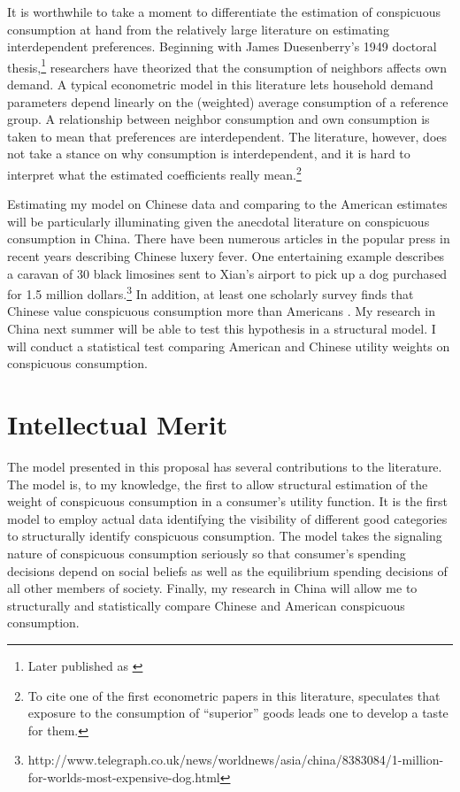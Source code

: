 \documentclass[a4paper,10pt]{article}
\begin{document}
It is worthwhile to take a moment to differentiate the estimation of conspicuous consumption at hand from the relatively large literature on estimating interdependent preferences.  Beginning with James Duesenberry's 1949 doctoral thesis,\footnote{Later published as \citep{Duesenberry1949}} researchers have theorized that the consumption of neighbors affects own demand.  A typical econometric model in this literature lets household demand parameters depend linearly on the (weighted) average consumption of a reference group. A relationship between neighbor consumption and own consumption is taken to mean that preferences are interdependent.  The literature, however, does not take a stance on why consumption is interdependent, and it is hard to interpret what the estimated coefficients really mean.\footnote{To cite one of the first econometric papers in this literature, \citet{Pollak1976} speculates that exposure to the consumption of ``superior'' goods leads one to develop a taste for them.}  

Estimating my model on Chinese data and comparing to the American estimates will be particularly illuminating given the anecdotal literature on conspicuous consumption in China.  There have been numerous articles in the popular press in recent years describing Chinese luxery fever.  One entertaining example describes a caravan of 30 black limosines sent to Xian's airport to pick up a dog purchased for 1.5 million dollars.\footnote{http://www.telegraph.co.uk/news/worldnews/asia/china/8383084/1-million-for-worlds-most-expensive-dog.html}  In addition, at least one scholarly survey finds that Chinese value conspicuous consumption more than Americans \citep{Podoshenetal2010}.  My research in China next summer will be able to test this hypothesis in a structural model.  I will conduct a statistical test comparing American and Chinese utility weights on conspicuous consumption.          

\section{Intellectual Merit}
The model presented in this proposal has several contributions to the literature.  The model is, to my knowledge, the first to allow structural estimation of the weight of conspicuous consumption in a consumer's utility function.  It is the first model to employ actual data identifying the visibility of different good categories to structurally identify conspicuous consumption.  The model takes the signaling nature of conspicuous consumption seriously so that consumer's spending decisions depend on social beliefs as well as the equilibrium spending decisions of all other members of society.  Finally, my research in China will allow me to structurally and statistically compare Chinese and American conspicuous consumption.        
\end{document}
